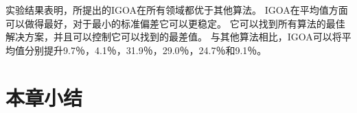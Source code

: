 实验结果表明，所提出的IGOA在所有领域都优于其他算法。 IGOA在平均值方面可以做得最好，对于最小的标准偏差它可以更稳定。 它可以找到所有算法的最佳解决方案，并且可以控制它可以找到的最差值。 与其他算法相比，IGOA可以将平均值分别提升9.7％，4.1％，31.9％，29.0％，24.7％和9.1％。

\section{本章小结}